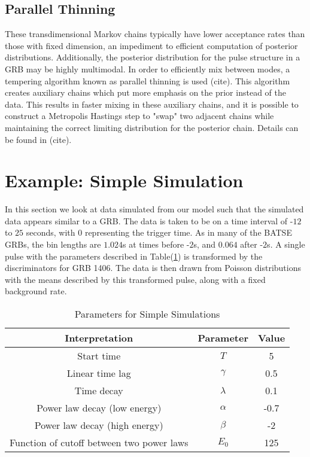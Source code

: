 \documentclass[iop,onecolumn]{emulateapj}
\newcommand{\Tab}[1]{Table\thinspace(\ref{#1})}
\begin{document}


    

   
    \subsection{Parallel Thinning}
    These transdimensional Markov chains typically have lower acceptance rates than those with fixed dimension, an impediment to efficient computation of posterior distributions. Additionally, the posterior distribution for the pulse structure in a GRB may be highly multimodal. In order to efficiently mix between modes, a tempering algorithm known as parallel thinning is used (cite). This algorithm creates auxiliary chains which put more emphasis on the prior instead of the data. This results in faster mixing in these auxiliary chains, and it is possible to construct a Metropolis Hastings step to "swap" two adjacent chains while maintaining the correct limiting distribution for the posterior chain. Details can be found in (cite).
%     
% 
 \section{Example: Simple Simulation}

In this section we look at data simulated from our model such that the simulated data appears similar to a GRB. The data is taken to be on a time interval of -$12$ to $25$ seconds, with $0$ representing the trigger time. As in many of the BATSE GRBs, the bin lengths are $1.024$s at times before -$2$s, and $0.064$ after -$2$s. A single pulse with the parameters described in \Tab{grb2d-simple-param} is transformed by the discriminators for GRB 1406. The data is then drawn from Poisson distributions with the means described by this transformed pulse, along with a fixed background rate.  
\begin{table}
\centering
 \begin{tabular}{|c |c |c|}
\hline
  Interpretation & Parameter & Value \\
\hline
  Start time & $T$ & 5 \\
  Linear time lag & $\gamma$ &0.5 \\
   Time decay & $\lambda$ & 0.1 \\ 
  Power law decay (low energy) & $\alpha$ & -0.7 \\
  Power law decay (high energy) & $\beta$ & -2 \\
  Function of cutoff between two power laws & $E_0$ & 125 \\
\hline
 \end{tabular}
\caption{Parameters for Simple Simulations}
\label{grb2d-simple-param}
\end{table}
\end{document}
